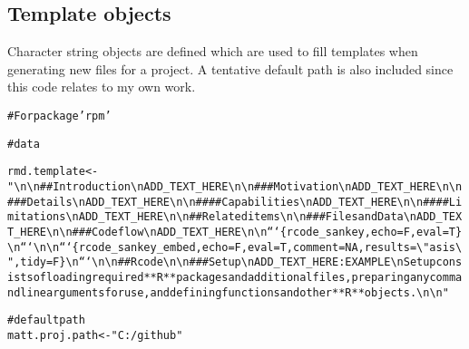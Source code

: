 \documentclass{article}\usepackage[]{graphicx}\usepackage[]{color}
\makeatletter
\newcommand{\hlstr}[1]{\textcolor[rgb]{0.863,0.196,0.184}{#1}}%
\newcommand{\hlcom}[1]{\textcolor[rgb]{0.345,0.431,0.459}{#1}}%
\newcommand{\hlstd}[1]{\textcolor[rgb]{0.514,0.58,0.588}{#1}}%
\newcommand{\hlkwb}[1]{\textcolor[rgb]{0.522,0.6,0}{#1}}%
\newenvironment{kframe}{%
 \def\at@end@of@kframe{}%
 \ifinner\ifhmode%
  \def\at@end@of@kframe{\end{minipage}}%
  \begin{minipage}{\columnwidth}%
 \fi\fi%
 \def\FrameCommand##1{\hskip\@totalleftmargin \hskip-\fboxsep
 \colorbox{shadecolor}{##1}\hskip-\fboxsep
     \hskip-\linewidth \hskip-\@totalleftmargin \hskip\columnwidth}%
 \MakeFramed {\advance\hsize-\width
   \@totalleftmargin\z@ \linewidth\hsize
   \@setminipage}}%
 {\par\unskip\endMakeFramed%
 \at@end@of@kframe}
\newenvironment{knitrout}{}{} %
\makeatother
\begin{document}
\title{}
\author{}
\maketitle





\subsection{Template objects}
Character string objects are defined which are used to fill templates when generating new files for a project.
A tentative default path is also included since this code relates to my own work.

\begin{knitrout}
\color{fgcolor}\begin{kframe}
\begin{alltt}
\hlcom{# For package 'rpm'}

\hlcom{# data}

\hlstd{rmd.template} \hlkwb{<-} \hlstr{"\textbackslash{}n\textbackslash{}n## Introduction\textbackslash{}nADD_TEXT_HERE\textbackslash{}n\textbackslash{}n### Motivation\textbackslash{}nADD_TEXT_HERE\textbackslash{}n\textbackslash{}n### Details\textbackslash{}nADD_TEXT_HERE\textbackslash{}n\textbackslash{}n#### Capabilities\textbackslash{}nADD_TEXT_HERE\textbackslash{}n\textbackslash{}n#### Limitations\textbackslash{}nADD_TEXT_HERE\textbackslash{}n\textbackslash{}n## Related items\textbackslash{}n\textbackslash{}n### Files and Data\textbackslash{}nADD_TEXT_HERE\textbackslash{}n\textbackslash{}n### Code flow\textbackslash{}nADD_TEXT_HERE\textbackslash{}n\textbackslash{}n```\{r code_sankey, echo=F, eval=T\}\textbackslash{}n```\textbackslash{}n\textbackslash{}n```\{r code_sankey_embed, echo=F, eval=T, comment=NA, results=\textbackslash{}"asis\textbackslash{}", tidy=F\}\textbackslash{}n```\textbackslash{}n\textbackslash{}n## R code\textbackslash{}n\textbackslash{}n### Setup\textbackslash{}nADD_TEXT_HERE: EXAMPLE\textbackslash{}nSetup consists of loading required **R** packages and additional files, preparing any command line arguments for use, and defining functions and other **R** objects.\textbackslash{}n\textbackslash{}n"}

\hlcom{# default path}
\hlstd{matt.proj.path} \hlkwb{<-} \hlstr{"C:/github"}
\end{alltt}
\end{kframe}
\end{knitrout}
\end{document}
